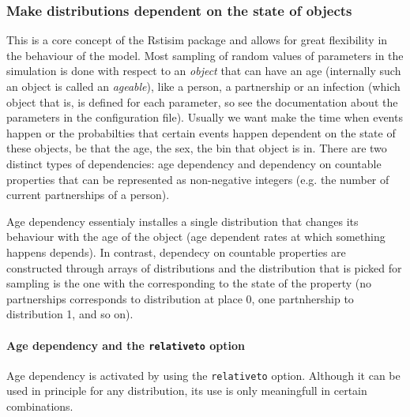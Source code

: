 \documentclass[11pt]{article}
\begin{document}
\subsubsection{Make distributions dependent on the state of objects}

This is a core concept of the Rstisim package and allows for great
flexibility in the behaviour of the model. Most sampling of random values of parameters in the simulation is done with
respect to an \emph{object} that can have an age (internally such an
object is called an \emph{ageable}), like a person, a partnership or an
infection (which object that is, is defined for each parameter, so see the
documentation about the parameters in the configuration file). Usually we want
make the time when events happen or the probabilties that certain events happen
dependent on the state of these objects, be that the age, the sex, the bin that
object is in. There are two distinct types of dependencies: age dependency and
dependency on countable properties that can be represented as non-negative
integers (e.g. the number of current partnerships of a person). 

Age dependency essentialy installes a single distribution that changes its
behaviour with the age of the object (age dependent rates at which something
happens depends). In contrast, dependecy on countable properties are constructed
through arrays of distributions and the distribution that is picked for sampling
is the one with the corresponding to the state of the property (no partnerships
corresponds to distribution at place 0, one partnhership to distribution 1, and
so on).

\paragraph{Age dependency and the \texttt{relativeto} option}

Age dependency is activated by using the \texttt{relativeto} option. Although
it can be used in principle for any distribution, its use is only meaningfull
in certain combinations.
\end{document}
